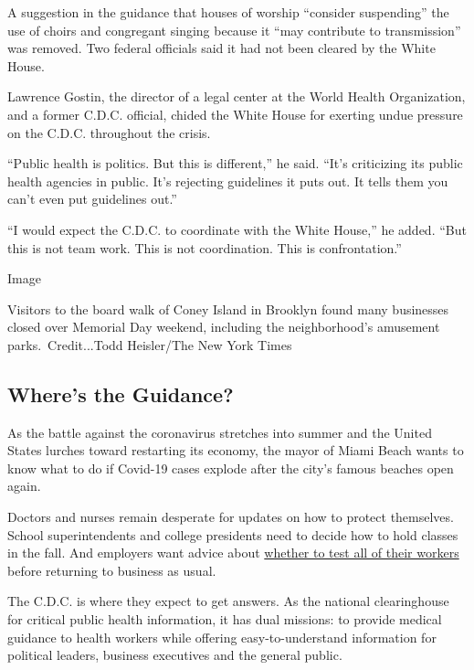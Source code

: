 A suggestion in the guidance that houses of worship ``consider
suspending'' the use of choirs and congregant singing because it ``may
contribute to transmission'' was removed. Two federal officials said it
had not been cleared by the White House.

Lawrence Gostin, the director of a legal center at the World Health
Organization, and a former C.D.C. official, chided the White House for
exerting undue pressure on the C.D.C. throughout the crisis.

``Public health is politics. But this is different,'' he said. ``It's
criticizing its public health agencies in public. It's rejecting
guidelines it puts out. It tells them you can't even put guidelines
out.''

``I would expect the C.D.C. to coordinate with the White House,'' he
added. ``But this is not team work. This is not coordination. This is
confrontation.''

Image

Visitors to the board walk of Coney Island in Brooklyn found many
businesses closed over Memorial Day weekend, including the
neighborhood's amusement parks.~Credit...Todd Heisler/The New York Times

\hypertarget{wheres-the-guidance}{%
\subsection{Where's the Guidance?}\label{wheres-the-guidance}}

As the battle against the coronavirus stretches into summer and the
United States lurches toward restarting its economy, the mayor of Miami
Beach wants to know what to do if Covid-19 cases explode after the
city's famous beaches open again.

Doctors and nurses remain desperate for updates on how to protect
themselves. School superintendents and college presidents need to decide
how to hold classes in the fall. And employers want advice about
\href{https://www.nytimes3xbfgragh.onion/2020/05/22/business/employers-coronavirus-testing.html}{whether
to test all of their workers} before returning to business as usual.

The C.D.C. is where they expect to get answers. As the national
clearinghouse for critical public health information, it has dual
missions: to provide medical guidance to health workers while offering
easy-to-understand information for political leaders, business
executives and the general public.

